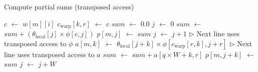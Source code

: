 \documentclass[10pt,nohyperref]{sigplanconf}
\newcommand*\Assign[2]{\State #1 $\gets$ #2}
\newcommand*\Bind[2]{\State {\bf let} #1 $\gets$ #2}
\newcommand*\Remark[1]{\State \(\triangleright\) #1}
\newcommand*\Var[1]{{\mathit{#1}}}
\begin{document}
\begin{algorithm}[t]
\caption{Compute partial sums (transposed access)}\label{alg:transposesum}
\begin{algorithmic}[1]
               \Bind{$c$}{$w[m][i]$}  \label{z6wordfetch}
                   \label{z6broadcaststart}
                 \Assign{$c_{\mathrm{warp}}[k,r]$}{$c$}    
               \EndFor     \label{z6broadcastend}
               \Bind{$\Var{sum}$}{$0.0$}
                 \Bind{$j$}{$0$}
                    \label{z6remnantsumstart}
                      \Assign{$\Var{sum}$}{$\Var{sum} + (\theta_{\mathrm{local}}[j] \times \phi[c, j])$}
                      \Assign{$p[m, j]$}{$\Var{sum}$}
                      \Assign{$j$}{$j + 1$}
                 \EndWhile   \label{z6remnantsumend}
                       \label{z6firstsumprodinnerloopstart}
                       \Remark{Next line uses transposed access to $\phi$}
                       \Assign{$a[m,k]$}{$\theta_{\mathrm{local}}[j+k] \times \phi[c_{\mathrm{warp}}[r,k], j+r]$}     \label{z6phiaccess}
                    \EndFor    \label{z6firstsumprodinnerloopend}
                       \label{z6secondsumprodinnerloopstart}
                       \Remark{Next line uses transposed access to $a$}
                       \Assign{$\Var{sum}$}{$\Var{sum} + a[q \times W + k, r]$}     \label{z6aaccess}
                       \Assign{$p[m, j+k]$}{$\Var{sum}$}
                    \EndFor    \label{z6secondsumprodinnerloopend}
                    \Assign{$j$}{$j + W$}
                 \EndWhile
\End
\end{algorithmic}
\end{algorithm}
\end{document}
